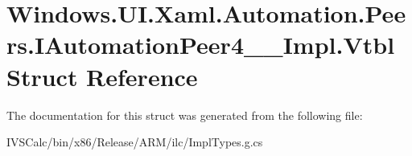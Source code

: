 \hypertarget{struct_windows_1_1_u_i_1_1_xaml_1_1_automation_1_1_peers_1_1_i_automation_peer4_____impl_1_1_vtbl}{}\section{Windows.\+U\+I.\+Xaml.\+Automation.\+Peers.\+I\+Automation\+Peer4\+\_\+\+\_\+\+Impl.\+Vtbl Struct Reference}
\label{struct_windows_1_1_u_i_1_1_xaml_1_1_automation_1_1_peers_1_1_i_automation_peer4_____impl_1_1_vtbl}


The documentation for this struct was generated from the following file\+:\begin{DoxyCompactItemize}
\item 
I\+V\+S\+Calc/bin/x86/\+Release/\+A\+R\+M/ilc/Impl\+Types.\+g.\+cs\end{DoxyCompactItemize}
